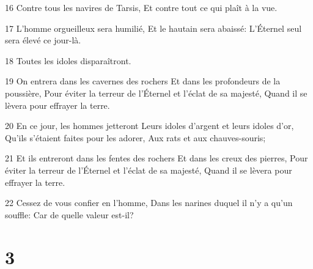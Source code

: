 \par 16 Contre tous les navires de Tarsis, Et contre tout ce qui plaît à la vue.
\par 17 L'homme orgueilleux sera humilié, Et le hautain sera abaissé: L'Éternel seul sera élevé ce jour-là.
\par 18 Toutes les idoles disparaîtront.
\par 19 On entrera dans les cavernes des rochers Et dans les profondeurs de la poussière, Pour éviter la terreur de l'Éternel et l'éclat de sa majesté, Quand il se lèvera pour effrayer la terre.
\par 20 En ce jour, les hommes jetteront Leurs idoles d'argent et leurs idoles d'or, Qu'ils s'étaient faites pour les adorer, Aux rats et aux chauves-souris;
\par 21 Et ils entreront dans les fentes des rochers Et dans les creux des pierres, Pour éviter la terreur de l'Éternel et l'éclat de sa majesté, Quand il se lèvera pour effrayer la terre.
\par 22 Cessez de vous confier en l'homme, Dans les narines duquel il n'y a qu'un souffle: Car de quelle valeur est-il?

\chapter{3}

